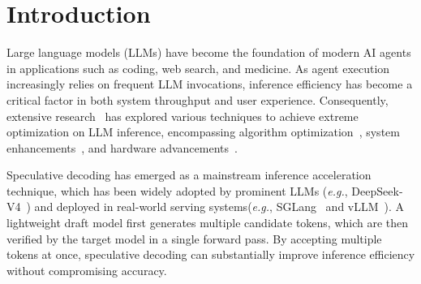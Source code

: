 \section{Introduction}




Large language models (LLMs) have become the foundation of modern AI agents in applications such as coding, web search, and medicine. As agent execution increasingly relies on frequent LLM invocations, inference efficiency has become a critical factor in both system throughput and user experience. Consequently, extensive research~\cite{zhou2024survey,li2024large} has explored various techniques to achieve extreme optimization on LLM inference, encompassing algorithm optimization~\cite{chen2026dflash,cheng2026dspark}, system enhancements~\cite{dao2022flashattention,hong2024flashdecoding++}, and hardware advancements~\cite{moon2024latency,prabhakar2024sambanova}.




Speculative decoding has emerged as a mainstream inference acceleration technique, which has been widely adopted by prominent LLMs (\textit{e.g.}, DeepSeek-V4~\cite{xu2026deepseek}) and deployed in real-world serving systems(\textit{e.g.}, SGLang~\cite{zheng2024sglang} and vLLM~\cite{kwon2023efficient}). A lightweight draft model first generates multiple candidate tokens, which are then verified by the target model in a single forward pass. By accepting multiple tokens at once, speculative decoding can substantially improve inference efficiency without compromising accuracy.


